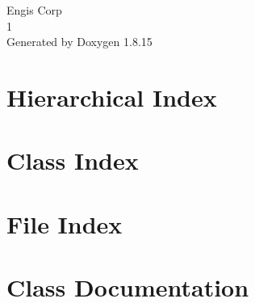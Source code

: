 \let\mypdfximage\pdfximage\def\pdfximage{\immediate\mypdfximage}\documentclass[twoside]{book}
\newcommand{\+}{\discretionary{\mbox{\scriptsize$\hookleftarrow$}}{}{}}
\newcommand{\clearemptydoublepage}{%
  \newpage{\pagestyle{empty}\cleardoublepage}%
}
\begin{document}
\hypersetup{pageanchor=false,
             bookmarksnumbered=true,
             pdfencoding=unicode
            }
\begin{titlepage}
\vspace*{7cm}
\begin{center}%
{\Large Engi\textquotesingle{}s Corp \\[1ex]\large 1 }\\
\vspace*{1cm}
{\large Generated by Doxygen 1.8.15}\\
\end{center}
\end{titlepage}
\clearemptydoublepage
{}
\tableofcontents
\clearemptydoublepage
{}
\hypersetup{pageanchor=true}

\chapter{Hierarchical Index}

\chapter{Class Index}

\chapter{File Index}

\chapter{Class Documentation}














































\end{document}
